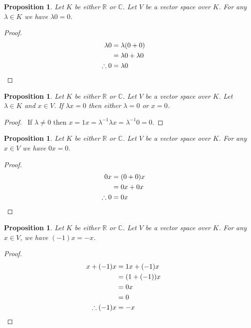 \documentclass{book}
\let\qed\relax
\newtheorem{prop}[ax]{Proposition}
\theoremstyle{definition}
\begin{document}
\begin{prop}
Let $K$ be either $\mathbb{R}$ or $\mathbb{C}$. Let $V$ be a vector space over $K$. For any $\lambda \in K$ we have $\lambda 0 = 0$.
\end{prop}

\begin{proof}
\pf\
\begin{align*}
\lambda 0 & = \lambda (0 + 0) \\
& = \lambda 0 + \lambda 0 \\
\therefore 0 & = \lambda 0 & \qed
\end{align*}
\end{proof}

\begin{prop}
Let $K$ be either $\mathbb{R}$ or $\mathbb{C}$. Let $V$ be a vector space over $K$. Let $\lambda \in K$ and $x \in V$. If $\lambda x = 0$ then either $\lambda = 0$ or $x = 0$.
\end{prop}

\begin{proof}
\pf\ If $\lambda \neq 0$ then $x = 1x = \lambda^{-1} \lambda x = \lambda^{-1} 0 = 0$. \qed
\end{proof}

\begin{prop}
\label{prop:zerotimes}
Let $K$ be either $\mathbb{R}$ or $\mathbb{C}$. Let $V$ be a vector space over $K$. For any $x \in V$ we have $0x = 0$.
\end{prop}

\begin{proof}
\pf
\begin{align*}
0x & = (0 + 0) x \\
& = 0x + 0x \\
\therefore 0 & = 0x & \qed
\end{align*}
\end{proof}

\begin{prop}
Let $K$ be either $\mathbb{R}$ or $\mathbb{C}$. Let $V$ be a vector space over $K$. For any $x \in V$, we have $(-1)x = -x$.
\end{prop}

\begin{proof}
\pf
\begin{align*}
x + (-1)x & = 1x + (-1) x \\
& = (1 + (-1))x \\
& = 0 x \\
& = 0 \\
\therefore (-1)x & = -x & \qed
\end{align*}
\end{proof}
\end{document}
